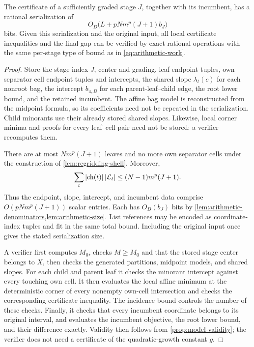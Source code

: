 \begin{proposition}
\label{prop:arithmetic-certificate}
The certificate of a sufficiently graded stage $J$, together with its
incumbent, has a rational serialization of
\[
 O_D\bigl(L+pNm^p(J+1)b_J\bigr)
\]
bits.  Given this serialization and the original input, all local certificate
inequalities and the final gap can be verified by exact rational operations
with the same per-stage type of bound as in
\cref{eq:arithmetic-work}.
\end{proposition}

\begin{proof}
Store the stage index $J$, center and grading, leaf endpoint tuples, own
separator cell endpoint tuples and intercepts, the shared slope
$\lambda_t(c)$ for each nonroot bag, the intercept $b_{u,B}$ for each
parent-leaf--child edge, the root lower bound, and the retained incumbent.
The affine bag model is reconstructed from the midpoint formula, so
its coefficients need not be repeated in the serialization.  Child
minorants use their already stored shared slopes.  Likewise, local corner
minima and proofs for every leaf--cell pair need not be stored: a verifier
recomputes them.

There are at most $Nm^p(J+1)$ leaves and no more own separator cells under
the construction of \cref{lem:regridding-shell}.  Moreover,
\[
 \sum_t\left\lvert \operatorname{ch}(t)\right\rvert\left\lvert \mathcal L_t\right\rvert
 \le (N-1)m^p(J+1).
\]
Thus the endpoint, slope, intercept, and incumbent data comprise
$O(pNm^p(J+1))$ scalar entries.  Each has $O_D(b_J)$ bits by
\cref{lem:arithmetic-denominators,lem:arithmetic-size}.  List references may
be encoded as coordinate-index tuples and fit in the same total bound.
Including the original input once gives the stated serialization size.

A verifier first computes $M_0$, checks $M\ge M_0$ and that the stored
stage center belongs to $X$, then checks the generated partitions,
midpoint models, and shared slopes. For each child
and parent leaf it checks the minorant
intercept against every touching own cell.  It then evaluates the local
affine minimum at the deterministic corner of every nonempty own-cell
intersection and checks the corresponding certificate inequality.  The
incidence bound controls the number of these checks.  Finally, it checks
that every incumbent coordinate belongs to its original interval, and
evaluates the incumbent objective, the root lower bound, and their
difference exactly.  Validity then follows from
\cref{prop:model-validity}; the verifier
does not need a certificate of the quadratic-growth constant $g$.
\end{proof}

